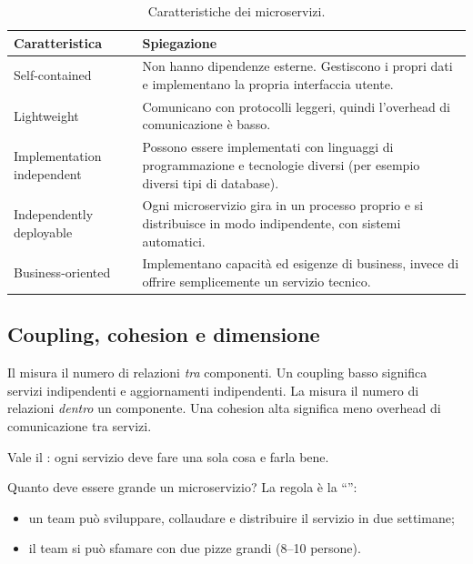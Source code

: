 \begin{table}[ht]
\centering
\small
\caption{Caratteristiche dei microservizi.}
\label{tab:micro-caratteristiche}
\begin{tabularx}{\linewidth}{>{\raggedright\arraybackslash}p{3.2cm}X}
\toprule
Caratteristica & Spiegazione \\
\midrule
Self-contained & Non hanno dipendenze esterne. Gestiscono i propri dati e implementano la propria interfaccia utente. \\
Lightweight & Comunicano con protocolli leggeri, quindi l'overhead di comunicazione è basso. \\
Implementation independent & Possono essere implementati con linguaggi di programmazione e tecnologie diversi (per
  esempio diversi tipi di database). \\
Independently deployable & Ogni microservizio gira in un processo proprio e si distribuisce in modo indipendente,
  con sistemi automatici. \\
Business-oriented & Implementano capacità ed esigenze di business, invece di offrire semplicemente un servizio tecnico. \\
\bottomrule
\end{tabularx}
\end{table}

\subsection{Coupling, cohesion e dimensione}

\begin{definizione}
Il  misura il numero di relazioni \emph{tra} componenti. Un coupling basso significa servizi
indipendenti e aggiornamenti indipendenti. La  misura il numero di relazioni \emph{dentro} un
componente. Una cohesion alta significa meno overhead di comunicazione tra servizi.
\end{definizione}

Vale il : ogni servizio deve fare una sola cosa e farla bene.

Quanto deve essere grande un microservizio? La regola è la ``'':
\begin{itemize}
  \item un team può sviluppare, collaudare e distribuire il servizio in due settimane;
  \item il team si può sfamare con due pizze grandi (8--10 persone).
\end{itemize}

